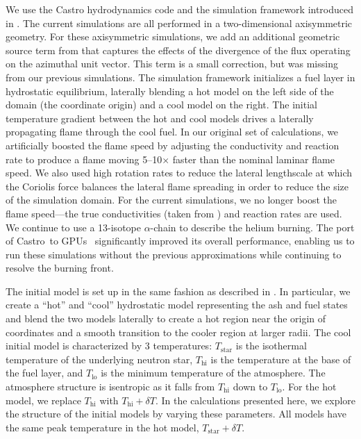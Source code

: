 \documentclass[preprint,times,tighten]{aastex63}
\newcommand{\castro}{{\sf Castro}}
\begin{document}
We use the Castro hydrodynamics code \citep{castro,castro_joss} and
the simulation framework introduced in \citet{flame_wave1}.  The
current simulations are all performed in a two-dimensional
axisymmetric geometry.  For these axisymmetric simulations, we add an
additional geometric source term from \citet{bernard-champmartin} that
captures the effects of the divergence of the flux operating on the
azimuthal unit vector.  This term is a small correction, but was
missing from our previous simulations.  The simulation framework
initializes a fuel layer in hydrostatic equilibrium, laterally
blending a hot model on the left side of the domain (the coordinate
origin) and a cool model on the right.  The initial temperature
gradient between the hot and cool models drives a laterally
propagating flame through the cool fuel.  In our original set of
calculations, we artificially boosted the flame speed by adjusting the
conductivity and reaction rate to produce a flame moving 5--10$\times$
faster than the nominal laminar flame speed.  We also used high
rotation rates to reduce the lateral lengthscale at which the Coriolis
force balances the lateral flame spreading in order to reduce the size 
of the simulation domain.  For the current
simulations, we no longer boost the flame speed---the true
conductivities (taken from \citealt{Timmes00}) and reaction rates are
used.  We continue to use a 13-isotope $\alpha$-chain to describe the
helium burning.  The port of \castro\ to GPUs~\citep{sc20_gpu} 
significantly improved its overall performance, enabling
us to run these simulations without the previous approximations while
continuing to resolve the burning front.

The initial model is set up in the same fashion as described in
\citet{flame_wave1}.  In particular, we create a ``hot'' and ``cool''
hydrostatic model representing the ash and fuel states and blend the
two models laterally to create a hot region near the origin of
coordinates and a smooth transition to the cooler region at larger
radii.  The cool initial model is characterized by 3 temperatures:
$T_\mathrm{star}$ is the isothermal temperature of the underlying
neutron star, $T_\mathrm{hi}$ is the temperature at the base of the
fuel layer, and $T_\mathrm{lo}$ is the minimum temperature of the
atmosphere. The atmosphere structure is isentropic as it falls from
$T_\mathrm{hi}$ down to $T_\mathrm{lo}$.  For the hot model, we
replace $T_\mathrm{hi}$ with $T_\mathrm{hi} + \delta T$.  In the
calculations presented here, we explore the structure of the initial
models by varying these parameters.  All models have the same
peak temperature in the hot model, $T_\mathrm{star} + \delta T$.
\end{document}
